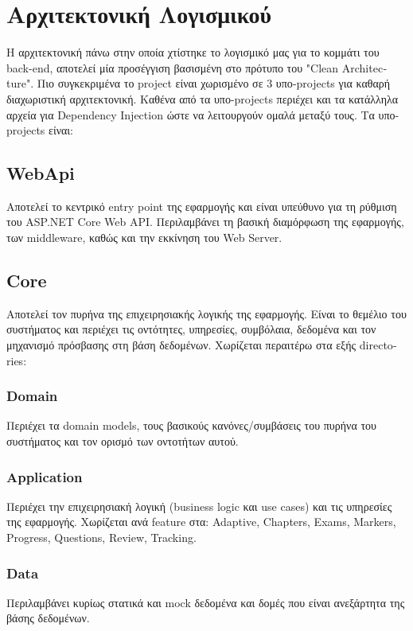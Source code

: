 \section{Αρχιτεκτονική Λογισμικού}
Η αρχιτεκτονική πάνω στην οποία χτίστηκε το λογισμικό μας για το κομμάτι του \textlatin{back-end}, αποτελεί μία προσέγγιση βασισμένη στο πρότυπο του \textlatin{"Clean Architecture"}. Πιο συγκεκριμένα το \textlatin{project} είναι χωρισμένο σε 3 υπο‑\textlatin{projects} για καθαρή διαχωριστική αρχιτεκτονική. Καθένα από τα υπο-\textlatin{projects} περιέχει και τα κατάλληλα αρχεία για \textlatin{Dependency Injection} ώστε να λειτουργούν ομαλά μεταξύ τους. Τα υπο-\textlatin{projects} είναι: 

\subsection{\textlatin{WebApi}}
Αποτελεί το κεντρικό \textlatin{entry point} της εφαρμογής και είναι υπεύθυνο για τη ρύθμιση του \textlatin{ASP.NET Core Web API}. Περιλαμβάνει τη βασική διαμόρφωση της εφαρμογής, των \textlatin{middleware}, καθώς και την εκκίνηση του \textlatin{Web Server}.


\subsection{\textlatin{Core}}
Αποτελεί τον πυρήνα της επιχειρησιακής λογικής της εφαρμογής. Είναι το θεμέλιο του συστήματος και περιέχει τις οντότητες, υπηρεσίες, συμβόλαια, δεδομένα και τον μηχανισμό πρόσβασης στη βάση δεδομένων. Χωρίζεται περαιτέρω στα εξής \textlatin{directories}:

\subsubsection{\textlatin{Domain}}
Περιέχει τα \textlatin{domain models}, τους βασικούς κανόνες/συμβάσεις του πυρήνα του συστήματος και τον ορισμό των οντοτήτων αυτού. 

\subsubsection{\textlatin{Application}}
Περιέχει την επιχειρησιακή λογική (\textlatin{business logic} και \textlatin{use cases}) και τις υπηρεσίες της εφαρμογής. Χωρίζεται ανά \textlatin{feature} στα: \textlatin{Adaptive, Chapters, Exams, Markers, Progress, Questions, Review, Tracking}.

\subsubsection{\textlatin{Data}}
Περιλαμβάνει κυρίως στατικά και \textlatin{mock} δεδομένα και δομές που είναι ανεξάρτητα της βάσης δεδομένων.

